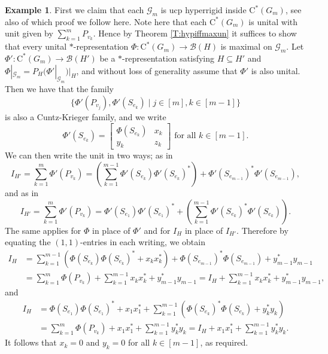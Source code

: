 \documentclass[11pt, draft]{amsart}
\numberwithin{equation}{section}
\theoremstyle{plain}
\theoremstyle{definition}
\newtheorem{example}[theorem]{Example}
\theoremstyle{remark}
\newcommand{\B}{{\mathcal{B}}}
\newcommand{\G}{{\mathcal{G}}}
\newcommand{\foral}{\text{ for all }}
\newcommand{\ca}{\mathrm{C}^*}
\begin{document}
\begin{example}
First we claim that each $\G_m$ is ucp hyperrigid inside $\ca(G_m)$, see also \cite[Theorem 4.1]{Sal17} of which proof we follow here.
Note here that each $\ca(G_m)$ is unital with unit given by $\sum_{k=1}^m P_{v_k}$.
Hence by Theorem \ref{T:hypiffmaxun} it suffices to show that every unital $*$-representation $\Phi \colon \ca(G_m) \to \B(H)$ is maximal on $\G_m$.
Let $\Phi' \colon \ca(G_m) \to \B(H')$ be a $*$-representation satisfying $H \subseteq H'$ and $\Phi|_{\G_m} = P_H (\Phi'|_{\G_m}) |_{H}$, and without loss of generality assume that $\Phi'$ is also unital.
Then we have that the family
\[
\{\Phi'(P_{v_j}), \Phi'(S_{e_k}) \mid j \in [m], k \in [m-1]\}
\]
is also a Cuntz-Krieger family, and we write
\[
\Phi'(S_{e_k}) = \begin{bmatrix} \Phi(S_{e_k}) & x_k \\ y_k & z_k \end{bmatrix}
\foral k \in [m-1].
\]
We can then write the unit in two ways; as in
\[
I_{H'} = \sum_{k=1}^m \Phi'(P_{v_k}) = (\sum_{k=1}^{m-1} \Phi'(S_{e_k}) \Phi'(S_{e_k})^*) + \Phi'(S_{e_{m-1}})^* \Phi'(S_{e_{m-1}}),
\]
and as in
\[
I_{H'} = \sum_{k=1}^m \Phi'(P_{v_k}) = \Phi'(S_{e_1}) \Phi'(S_{e_1})^* + (\sum_{k=1}^{m-1} \Phi'(S_{e_k})^* \Phi'(S_{e_k})).
\]
The same applies for $\Phi$ in place of $\Phi'$ and for $I_H$ in place of $I_{H'}$.
Therefore by equating the $(1,1)$-entries in each writing, we obtain
\begin{align*}
I_{H} 
& = 
\sum_{k=1}^{m-1} (\Phi(S_{e_k}) \Phi(S_{e_k})^* + x_k x_k^*) + \Phi(S_{e_{m-1}})^* \Phi(S_{e_{m-1}}) + y_{m-1}^* y_{m-1} \\
& = 
\sum_{k=1}^m \Phi(P_{v_k}) + \sum_{k=1}^{m-1} x_k x_k^* + y_{m-1}^*y_{m-1} 
=
I_H +\sum_{k=1}^{m-1} x_k x_k^* + y_{m-1}^*y_{m-1},
\end{align*}
and
\begin{align*}
I_{H} 
& = \Phi(S_{e_1}) \Phi(S_{e_1})^* + x_1 x_1^* + \sum_{k=1}^{m-1} (\Phi(S_{e_k})^* \Phi(S_{e_k}) + y_k^*y_k) \\
& = 
\sum_{k=1}^{m} \Phi(P_{v_k}) + x_1x_1^* + \sum_{k=1}^{m-1} y_k^*y_k 
=
I_H + x_1x_1^* + \sum_{k=1}^{m-1} y_k^*y_k.
\end{align*}
It follows that $x_k=0$ and $y_k=0$ for all $ k \in [m-1]$, as required.


\end{example}
\end{document}
